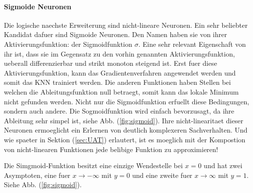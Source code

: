 \documentclass[../main]{subfiles}
\begin{document}
\paragraph{Sigmoide Neuronen}
Die logische naechste Erweiterung sind nicht-lineare Neuronen.
Ein sehr beliebter Kandidat dafuer sind Sigmoide Neuronen.
Den Namen haben sie von ihrer Aktivierungsfunktion: der Sigmoidfunktion $\sigma$.
Eine sehr relevant Eigenschaft von ihr ist, dass sie im Gegensatz zu den vorhin
genannten Aktivierungsfunktion, ueberall differenzierbar und strikt monoton
steigend ist. Erst fuer diese Aktivierungsfunktion, kann das Gradientenverfahren
angewendet werden und somit das KNN trainiert werden. Die anderen
Funktionen haben Stellen bei welchen die Ableitungsfunktion null
betraegt, somit kann das lokale Minimum nicht gefunden werden.
Nicht nur die Sigmoidfunktion erfuellt diese Bedingungen, sondern auch andere. Die Sogmoidfunktion wird
einfach bevorzusagt, da ihre Ableitung sehr simpel ist, siehe Abb. (\ref{fig:sigmoid}).
Ihre nicht-linearitaet dieser Neuronen ermoeglicht ein Erlernen von deutlich komplexeren Sachverhalten.
Und wie spaeter in Sektion (\ref{sec:UAT}) erlautert, ist es moeglich mit der Kompostion von nicht-linearen
Funktionen jede belibige Funktion zu approximieren!
\par\medskip
Die Simgmoid-Funktion besitzt eine einzige Wendestelle bei $x=0$ und hat zwei Asymptoten, eine fuer $x \to -\infty$ mit $y=0$
und eine zweite fuer $x \to\infty$ mit $y=1$. Siehe Abb. (\ref{fig:sigmoid}).
\end{document}
